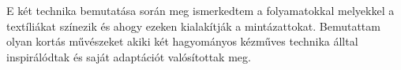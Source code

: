 \documentclass[fontsize=12pt, appendixprefix=true]{scrreprt}
\begin{document}
E két technika bemutatása során meg ismerkedtem a folyamatokkal melyekkel a textíliákat színezik és ahogy ezeken kialakítják a mintázattokat.
Bemutattam olyan kortás művészeket akiki  két hagyományos kézműves technika álltal inspirálódtak és saját adaptációt valósítottak meg.






\end{document}
